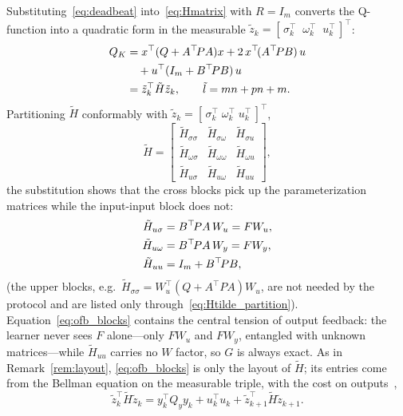 \documentclass[final,5p,times]{elsarticle}
\theoremstyle{plain}
\theoremstyle{definition}
\theoremstyle{remark}
\begin{document}
Substituting~\eqref{eq:deadbeat} into~\eqref{eq:Hmatrix} with $R = I_m$ converts the Q-function into a quadratic form in the measurable $\tilde{z}_k = [\,\sigma_k^\top \;\; \omega_k^\top \;\; u_k^\top\,]^\top$:
\begin{align}
Q_K &= x^\top(Q + A^\top\! PA)x + 2\,x^\top\!(A^\top\! PB)\,u \notag\\
&\quad + u^\top(I_m + B^\top\! PB)\,u \notag\\
&= \tilde{z}_k^\top \tilde{H} \tilde{z}_k, \qquad \tilde{l} = mn + pn + m.
\label{eq:ofb_qfunc}
\end{align}
Partitioning $\tilde{H}$ conformably with $\tilde{z}_k = [\,\sigma_k^\top \; \omega_k^\top \; u_k^\top\,]^\top$,
\begin{equation}
\tilde{H} = \begin{bmatrix}
\tilde{H}_{\sigma\sigma} & \tilde{H}_{\sigma\omega} & \tilde{H}_{\sigma u} \\
\tilde{H}_{\omega\sigma} & \tilde{H}_{\omega\omega} & \tilde{H}_{\omega u} \\
\tilde{H}_{u\sigma} & \tilde{H}_{u\omega} & \tilde{H}_{uu}
\end{bmatrix},
\label{eq:Htilde_partition}
\end{equation}
the substitution shows that the cross blocks pick up the parameterization matrices while the input-input block does not:
\begin{align}
\tilde{H}_{u\sigma} &= B^\top\! P A\, W_u = F W_u, \notag\\
\tilde{H}_{u\omega} &= B^\top\! P A\, W_y = F W_y, \label{eq:ofb_blocks}\\
\tilde{H}_{uu} &= I_m + B^\top\! P B, \notag
\end{align}
(the upper blocks, e.g.\ $\tilde{H}_{\sigma\sigma} = W_u^\top(Q + A^\top\! PA)W_u$, are not needed by the protocol and are listed only through~\eqref{eq:Htilde_partition}).
Equation~\eqref{eq:ofb_blocks} contains the central tension of output feedback: the learner never sees $F$ alone---only $FW_u$ and $FW_y$, entangled with unknown matrices---while $\tilde{H}_{uu}$ carries no $W$ factor, so $G$ is always exact. As in Remark~\ref{rem:layout}, \eqref{eq:ofb_blocks} is only the layout of $\tilde{H}$; its entries come from the Bellman equation on the measurable triple, with the cost on outputs~\cite[Eq.~(2.27)]{rizvi2022},
\begin{equation}
\tilde{z}_k^\top \tilde{H} \tilde{z}_k = y_k^\top Q_y y_k + u_k^\top u_k + \tilde{z}_{k+1}^\top \tilde{H} \tilde{z}_{k+1}.
\label{eq:ofb_bellman}
\end{equation}
\end{document}
